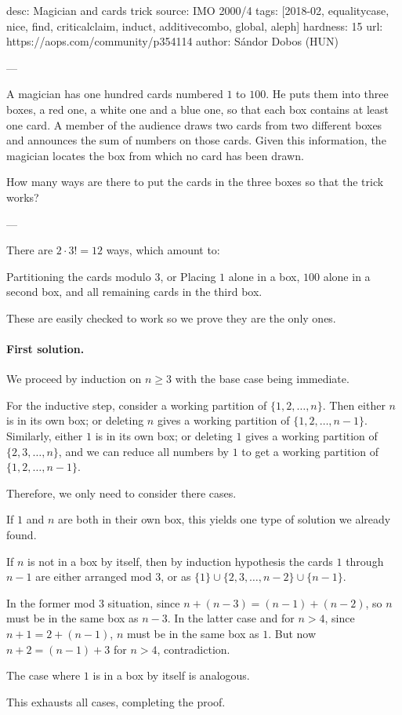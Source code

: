 desc: Magician and cards trick
source: IMO 2000/4
tags: [2018-02, equalitycase, nice, find, criticalclaim, induct, additivecombo, global, aleph]
hardness: 15
url: https://aops.com/community/p354114
author: Sándor Dobos (HUN)

---

A magician has one hundred cards numbered $1$ to $100$.
He puts them into three boxes, a red one, a white one and a blue one,
so that each box contains at least one card.
A member of the audience draws two cards from two different boxes
and announces the sum of numbers on those cards.
Given this information,
the magician locates the box from which no card has been drawn.

How many ways are there to put the cards
in the three boxes so that the trick works?

---

There are $2 \cdot 3! = 12$ ways, which amount to:
\begin{itemize}
  \ii Partitioning the cards modulo $3$, or
  \ii Placing $1$ alone in a box,
  $100$ alone in a second box,
  and all remaining cards in the third box.
\end{itemize}
These are easily checked to work so we prove they are the only ones.

\paragraph{First solution.}
We proceed by induction on $n \ge 3$ with the base case being immediate.

For the inductive step,
consider a working partition of $\{1, 2, \dots, n\}$.
Then either $n$ is in its own box; or
deleting $n$ gives a working partition of $\{1, 2, \dots, n-1\}$.
Similarly, either $1$ is in its own box; or
deleting $1$ gives a working partition of $\{2, 3, \dots, n\}$,
and we can reduce all numbers by $1$ to get
a working partition of $\{1, 2, \dots, n-1\}$.

Therefore, we only need to consider there cases.
\begin{itemize}
  \ii If $1$ and $n$ are both in their own box,
  this yields one type of solution we already found.

  \ii If $n$ is not in a box by itself,
  then by induction hypothesis the cards $1$ through $n-1$
  are either arranged mod $3$,
  or as $\{1\} \cup \{2,3,\dots,n-2\} \cup \{n-1\}$.
  \begin{itemize}
    \ii In the former mod $3$ situation,
    since $n + (n-3) = (n-1) + (n-2)$,
    so $n$ must be in the same box as $n-3$.
    \ii In the latter case and for $n > 4$,
    since $n + 1 = 2 + (n-1)$,
    $n$ must be in the same box as $1$.
    But now $n + 2 = (n-1) + 3$ for $n > 4$, contradiction.
  \end{itemize}

  \ii The case where $1$ is in a box by itself is analogous.
\end{itemize}
This exhausts all cases, completing the proof.

